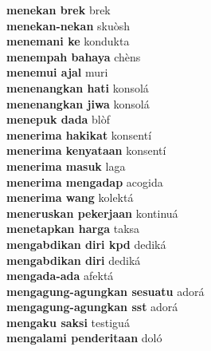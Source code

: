 \textbf{ menekan brek  } brek \\
\textbf{ menekan-nekan  } skuòsh \\
\textbf{ menemani ke  } kondukta \\
\textbf{ menempah bahaya  } chèns \\
\textbf{ menemui ajal  } muri \\
\textbf{ menenangkan hati  } konsolá \\
\textbf{ menenangkan jiwa  } konsolá \\
\textbf{ menepuk dada  } blòf \\
\textbf{ menerima hakikat  } konsentí \\
\textbf{ menerima kenyataan  } konsentí \\
\textbf{ menerima masuk  } laga \\
\textbf{ menerima mengadap  } acogida \\
\textbf{ menerima wang  } kolektá \\
\textbf{ meneruskan pekerjaan  } kontinuá \\
\textbf{ menetapkan harga  } taksa \\
\textbf{ mengabdikan diri kpd  } dediká \\
\textbf{ mengabdikan diri  } dediká \\
\textbf{ mengada-ada  } afektá \\
\textbf{ mengagung-agungkan sesuatu  } adorá \\
\textbf{ mengagung-agungkan sst  } adorá \\
\textbf{ mengaku saksi  } testiguá \\
\textbf{ mengalami penderitaan  } doló \\
